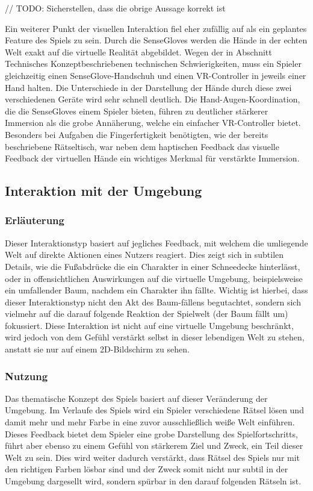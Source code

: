 // TODO: Sicherstellen, dass die obrige Aussage korrekt ist

Ein weiterer Punkt der visuellen Interaktion fiel eher zufällig auf als ein geplantes Feature des Spiels zu sein. Durch die SenseGloves werden die Hände in der echten Welt exakt auf die virtuelle Realität abgebildet. Wegen der in Abschnitt \dq Technisches Konzept\dq beschriebenen technischen Schwierigkeiten, muss ein Spieler gleichzeitig einen SenseGlove-Handschuh und einen VR-Controller in jeweils einer Hand halten. Die Unterschiede in der Darstellung der Hände durch diese zwei verschiedenen Geräte wird sehr schnell deutlich. Die Hand-Augen-Koordination, die die SenseGloves einem Spieler bieten, führen zu deutlicher stärkerer Immersion als die grobe Annäherung, welche ein einfacher VR-Controller bietet. Besonders bei Aufgaben die Fingerfertigkeit benötigten, wie der bereits beschriebene Rätseltisch, war neben dem haptischen Feedback das visuelle Feedback der virtuellen Hände ein wichtiges Merkmal für verstärkte Immersion.

\subsection{Interaktion mit der Umgebung}
\subsubsection{Erläuterung}
Dieser Interaktionstyp basiert auf jegliches Feedback, mit welchem die umliegende Welt auf direkte Aktionen eines Nutzers reagiert. Dies zeigt sich in subtilen Details, wie die Fußabdrücke die ein Charakter in einer Schneedecke hinterlässt, oder in offensichtlichen Auswirkungen auf die virtuelle Umgebung, beispielsweise ein umfallender Baum, nachdem ein Charakter ihn fällte. Wichtig ist hierbei, dass dieser Interaktionstyp nicht den Akt des Baum-fällens begutachtet, sondern sich vielmehr auf die darauf folgende Reaktion der Spielwelt (der Baum fällt um) fokussiert. Diese Interaktion ist nicht auf eine virtuelle Umgebung beschränkt, wird jedoch von dem Gefühl verstärkt selbst in dieser lebendigen Welt zu stehen, anstatt sie nur auf einem 2D-Bildschirm zu sehen.

\subsubsection{Nutzung}
Das thematische Konzept des Spiels basiert auf dieser Veränderung der Umgebung. Im Verlaufe des Spiels wird ein Spieler verschiedene Rätsel lösen und damit mehr und mehr Farbe in eine zuvor ausschließlich weiße Welt einführen. Dieses Feedback bietet dem Spieler eine grobe Darstellung des Spielfortschritts, führt aber ebenso zu einem Gefühl von stärkerem Ziel und Zweck, ein Teil dieser Welt zu sein. Dies wird weiter dadurch verstärkt, dass Rätsel des Spiels nur mit den richtigen Farben lösbar sind und der Zweck somit nicht nur subtil in der Umgebung dargesellt wird, sondern spürbar in den darauf folgenden Rätseln ist.

